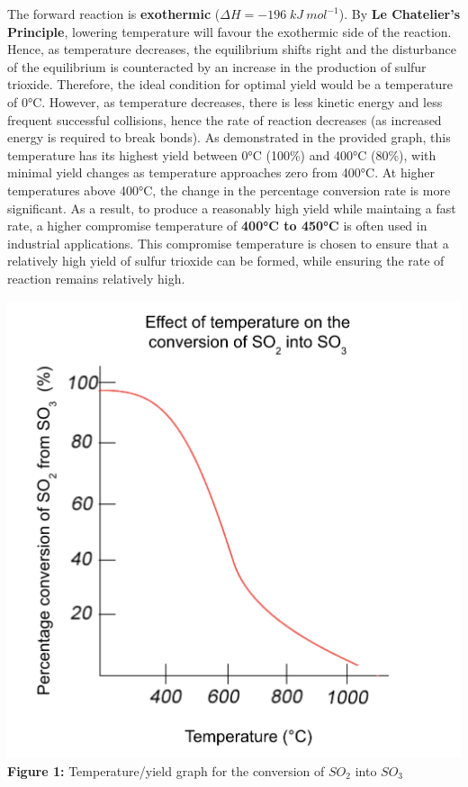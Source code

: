 \documentclass[12pt, a4paper]{article}
\begin{document}
The forward reaction is \textbf{exothermic} (\(\Delta H = -196 \; kJ \: mol^{-1}\)). By \textbf{Le Chatelier's Principle}, lowering temperature will favour the exothermic side of the reaction. Hence, as temperature decreases, the equilibrium shifts right and the disturbance of the equilibrium is counteracted by an increase in the production of sulfur trioxide. Therefore, the ideal condition for optimal yield would be a temperature of 0°C. However, as temperature decreases, there is less kinetic energy and less frequent successful collisions, hence the rate of reaction decreases (as increased energy is required to break bonds). As demonstrated in the provided graph, this temperature has its highest yield between 0°C (100\%) and 400°C (80\%), with minimal yield changes as temperature approaches zero from 400°C. At higher temperatures above 400°C, the change in the percentage conversion rate is more significant. As a result, to produce a reasonably high yield while maintaing a fast rate, a higher compromise temperature of \textbf{400°C to 450°C} is often used in industrial applications. This compromise temperature is chosen to ensure that a relatively high yield of sulfur trioxide can be formed, while ensuring the rate of reaction remains relatively high.

\begin{center}
\includegraphics[scale=0.5]{graph}
\\
\textbf{Figure 1:} Temperature/yield graph for the conversion of \(SO_{2}\) into \(SO_{3}\)
\end{center}
\end{document}
